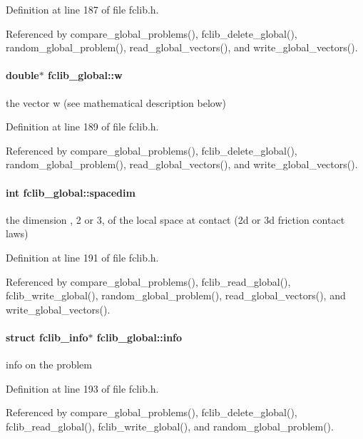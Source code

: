 Definition at line 187 of file fclib.\-h.



Referenced by compare\-\_\-global\-\_\-problems(), fclib\-\_\-delete\-\_\-global(), random\-\_\-global\-\_\-problem(), read\-\_\-global\-\_\-vectors(), and write\-\_\-global\-\_\-vectors().

\hypertarget{structfclib__global_a8b175716b6c1f84509cf44b36a76e7ca}{
\paragraph[{w}]{\setlength{\rightskip}{0pt plus 5cm}double$\ast$ fclib\-\_\-global\-::w}}\label{structfclib__global_a8b175716b6c1f84509cf44b36a76e7ca}


the vector w (see mathematical description below) 



Definition at line 189 of file fclib.\-h.



Referenced by compare\-\_\-global\-\_\-problems(), fclib\-\_\-delete\-\_\-global(), random\-\_\-global\-\_\-problem(), read\-\_\-global\-\_\-vectors(), and write\-\_\-global\-\_\-vectors().

\hypertarget{structfclib__global_a86dac5928d2c652f15ac688df14989a0}{
\paragraph[{spacedim}]{\setlength{\rightskip}{0pt plus 5cm}int fclib\-\_\-global\-::spacedim}}\label{structfclib__global_a86dac5928d2c652f15ac688df14989a0}


the dimension , 2 or 3, of the local space at contact (2d or 3d friction contact laws) 



Definition at line 191 of file fclib.\-h.



Referenced by compare\-\_\-global\-\_\-problems(), fclib\-\_\-read\-\_\-global(), fclib\-\_\-write\-\_\-global(), random\-\_\-global\-\_\-problem(), read\-\_\-global\-\_\-vectors(), and write\-\_\-global\-\_\-vectors().

\hypertarget{structfclib__global_aa6b4e80afc92dd1a9b260ff3a096b352}{
\paragraph[{info}]{\setlength{\rightskip}{0pt plus 5cm}struct {\bf fclib\-\_\-info}$\ast$ fclib\-\_\-global\-::info}}\label{structfclib__global_aa6b4e80afc92dd1a9b260ff3a096b352}


info on the problem 



Definition at line 193 of file fclib.\-h.



Referenced by compare\-\_\-global\-\_\-problems(), fclib\-\_\-delete\-\_\-global(), fclib\-\_\-read\-\_\-global(), fclib\-\_\-write\-\_\-global(), and random\-\_\-global\-\_\-problem().

